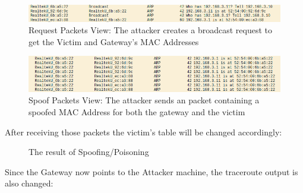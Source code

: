 \begin{figure}[h!]
 \centering
 \includegraphics[width=13cm]{img/wireshark_request_mac.png}
 \caption{ Request Packets View: The attacker creates a broadcast  request to get the Victim and Gateway's MAC Addresses}
 \label{fig: ARP Request wireshark}
\end{figure}

\begin{figure}[h!]
 \centering
 \includegraphics[width=13cm]{img/wireshark_arp_spoof.png}
 \caption{ Spoof Packets View: The attacker sends an  packet containing a spoofed MAC Address for both the gateway and the victim}
 \label{fig: ARP Spoof Wireshark}
\end{figure}

After receiving those packets the victim's  table will be changed accordingly:

\begin{figure}[!hb]
\centering
 \vspace{0.5cm}
 \caption{The result of  Spoofing/Poisoning}\label{fig: spoof-before-after}
\end{figure}

Since the Gateway now points to the Attacker machine, the traceroute output is also changed:

